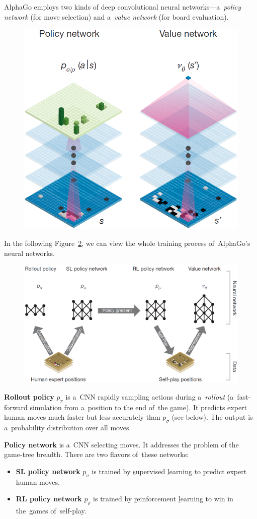 AlphaGo employs two kinds of deep convolutional neural networks---a~\emph{policy network} (for move selection) and a~\emph{value network} (for board evaluation).
\begin{figure}[H]
  \centering
  \includegraphics[width=.5\textwidth]{../img/policy_and_value_network.png}
  \label{fig:policy_vs_value_nets}
\end{figure}

In the following Figure~\ref{fig:neural_nets_pipeline}, we can view the whole training process of~AlphaGo's neural networks.
\begin{figure}[H]
  \centering
  \includegraphics[width=.7\textwidth]{../img/neural_nets_pipeline.png}
  \label{fig:neural_nets_pipeline}
\end{figure}

\textbf{Rollout policy} $p_\pi$ is a~CNN rapidly sampling actions during a~\emph{rollout} (a~fast-forward simulation from a~position to the end of~the game).
It predicts expert human moves much faster but less accurately than $p_\sigma$ (see below).
The output is a~probability distribution over all moves.

\textbf{Policy network} is a~CNN selecting moves.
It addresses the problem of the game-tree breadth.
There are two flavors of~these networks:
\begin{itemize}
  \item \textbf{SL policy network} $p_\sigma$ is trained by \underline{s}upervised \underline{l}earning to predict expert human moves.
  \item \textbf{RL policy network} $p_\rho$ is trained by \underline{r}einforcement \underline{l}earning to win in the~games of~self-play.
\end{itemize}

